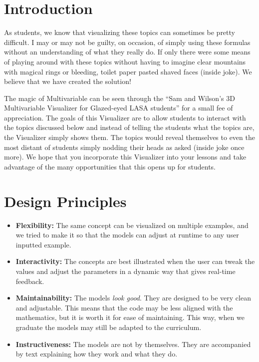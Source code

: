 \documentclass[12pt,letterpaper,english]{article}
\begin{document}
\tableofcontents

\clearpage

\doublespacing

\section{Introduction}

 As students, we know that visualizing these topics can sometimes be pretty difficult. I may or may not be guilty, on occasion, of simply using these formulas without an understanding of what they really do. If only there were some means of playing around with these topics without having to imagine clear mountains with magical rings or bleeding, toilet paper pasted shaved faces (inside joke). We believe that we have created the solution!

 The magic of Multivariable can be seen through the “Sam and Wilson’s 3D Multivariable Visualizer for Glazed-eyed LASA students” for a small fee of appreciation. The goals of this Visualizer are to allow students to interact with the topics discussed below and instead of telling the students  what the topics are, the Visualizer simply shows them. The topics would reveal themselves to even the most distant of students simply nodding their heads as asked (inside joke once more). We hope that you incorporate this Visualizer into your lessons and take advantage of the many opportunities that this opens up for students.

\section{Design Principles}

\begin{itemize}
\item \textbf{Flexibility:} The same concept can be visualized on multiple examples, and we tried to make it so that the models can adjust at runtime to any user inputted example.
\item \textbf{Interactivity:} The concepts are best illustrated when the user can tweak the values and adjust the parameters in a dynamic way that gives real-time feedback.
\item \textbf{Maintainability:} The models \textit{look good}. They are designed to be very clean and adjustable. This means that the code may be less aligned with the mathematics, but it is worth it for ease of maintaining. This way, when we graduate the models may still be adapted to the curriculum.
\item \textbf{Instructiveness:} The models are not by themselves. They are accompanied by text %
explaining how they work and what they do.
\end{itemize}


\end{document}
